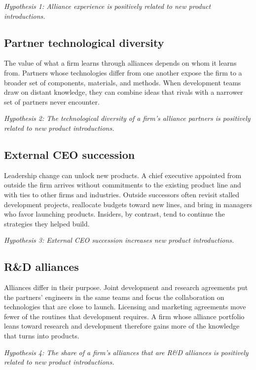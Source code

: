 \documentclass[12pt]{article}
\begin{document}
\textit{Hypothesis 1: Alliance experience is positively related to new product introductions.}

\subsection{Partner technological diversity}

The value of what a firm learns through alliances depends on whom it learns from. Partners whose technologies differ from one another expose the firm to a broader set of components, materials, and methods. When development teams draw on distant knowledge, they can combine ideas that rivals with a narrower set of partners never encounter.

\textit{Hypothesis 2: The technological diversity of a firm's alliance partners is positively related to new product introductions.}

\subsection{External CEO succession}

Leadership change can unlock new products. A chief executive appointed from outside the firm arrives without commitments to the existing product line and with ties to other firms and industries. Outside successors often revisit stalled development projects, reallocate budgets toward new lines, and bring in managers who favor launching products. Insiders, by contrast, tend to continue the strategies they helped build.

\textit{Hypothesis 3: External CEO succession increases new product introductions.}

\subsection{R\&D alliances}

Alliances differ in their purpose. Joint development and research agreements put the partners' engineers in the same teams and focus the collaboration on technologies that are close to launch. Licensing and marketing agreements move fewer of the routines that development requires. A firm whose alliance portfolio leans toward research and development therefore gains more of the knowledge that turns into products.

\textit{Hypothesis 4: The share of a firm's alliances that are R\&D alliances is positively related to new product introductions.}
\end{document}
